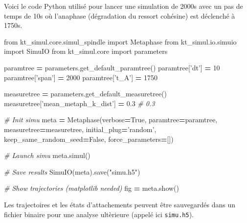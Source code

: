 \documentclass[12pt,a4paper,twoside,openright]{book}
\newenvironment{Shaded}{\begin{snugshade}}{\end{snugshade}}
\newcommand{\DecValTok}[1]{\textcolor[rgb]{0.00,0.00,0.81}{{#1}}}
\newcommand{\FloatTok}[1]{\textcolor[rgb]{0.00,0.00,0.81}{{#1}}}
\newcommand{\StringTok}[1]{\textcolor[rgb]{0.31,0.60,0.02}{{#1}}}
\newcommand{\ImportTok}[1]{{#1}}
\newcommand{\CommentTok}[1]{\textcolor[rgb]{0.56,0.35,0.01}{\textit{{#1}}}}
\newcommand{\VariableTok}[1]{\textcolor[rgb]{0.00,0.00,0.00}{{#1}}}
\newcommand{\OperatorTok}[1]{\textcolor[rgb]{0.81,0.36,0.00}{\textbf{{#1}}}}
\newcommand{\NormalTok}[1]{{#1}}
\begin{document}
\label{sec:ktsimul}

Voici le code Python utilisé pour lancer une simulation de 2000s avec un
pas de temps de 10s où l'anaphase (dégradation du ressort cohésine) est
déclenché à 1750s.

\begin{Shaded}
\begin{Highlighting}[]
\ImportTok{from} \NormalTok{kt_simul.core.simul_spindle }\ImportTok{import} \NormalTok{Metaphase}
\ImportTok{from} \NormalTok{kt_simul.io.simuio }\ImportTok{import} \NormalTok{SimuIO}
\ImportTok{from} \NormalTok{kt_simul.core }\ImportTok{import} \NormalTok{parameters}

\NormalTok{paramtree }\OperatorTok{=} \NormalTok{parameters.get_default_paramtree()}
\NormalTok{paramtree[}\StringTok{'dt'}\NormalTok{] }\OperatorTok{=} \DecValTok{10}
\NormalTok{paramtree[}\StringTok{'span'}\NormalTok{] }\OperatorTok{=} \DecValTok{2000}
\NormalTok{paramtree[}\StringTok{'t_A'}\NormalTok{] }\OperatorTok{=} \DecValTok{1750}

\NormalTok{measuretree }\OperatorTok{=} \NormalTok{parameters.get_default_measuretree()}
\NormalTok{measuretree[}\StringTok{'mean_metaph_k_dist'}\NormalTok{] }\OperatorTok{=} \FloatTok{0.3}  \CommentTok{# 0.3}

\CommentTok{# Init simu}
\NormalTok{meta }\OperatorTok{=} \NormalTok{Metaphase(verbose}\OperatorTok{=}\VariableTok{True}\NormalTok{,}
                 \NormalTok{paramtree}\OperatorTok{=}\NormalTok{paramtree,}
                 \NormalTok{measuretree}\OperatorTok{=}\NormalTok{measuretree,}
                 \NormalTok{initial_plug}\OperatorTok{=}\StringTok{'random'}\NormalTok{,}
                 \NormalTok{keep_same_random_seed}\OperatorTok{=}\VariableTok{False}\NormalTok{,}
                 \NormalTok{force_parameters}\OperatorTok{=}\NormalTok{[])}

\CommentTok{# Launch simu}
\NormalTok{meta.simul()}

\CommentTok{# Save results}
\NormalTok{SimuIO(meta).save(}\StringTok{"simu.h5"}\NormalTok{)}

\CommentTok{# Show trajectories (matplotlib needed)}
\NormalTok{fig }\OperatorTok{=} \NormalTok{meta.show()}
\end{Highlighting}
\end{Shaded}

Les trajectoires et les états d'attachements peuvent être sauvegardés
dans un fichier binaire pour une analyse ultèrieure (appelé ici
\texttt{simu.h5}).
\end{document}
